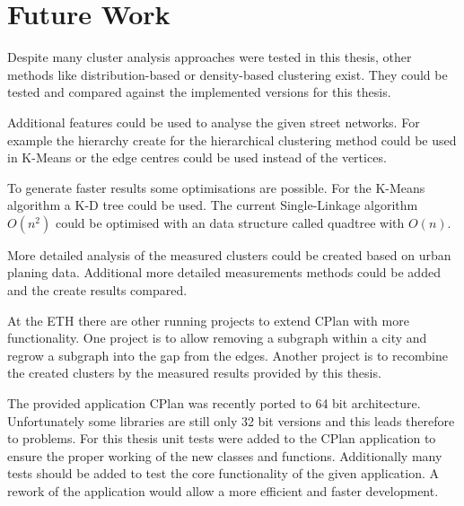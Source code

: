 \chapter{Future Work}
\label{sec:future_work}

Despite many cluster analysis approaches were tested in this thesis, other methods like distribution-based or density-based clustering exist. They could be tested and compared against the implemented versions for this thesis.

Additional features could be used to analyse the given street networks. For example the hierarchy create for the hierarchical clustering method could be used in K-Means or the edge centres could be used instead of the vertices.

To generate faster results some optimisations are possible. For the K-Means algorithm a K-D tree could be used. The current Single-Linkage algorithm $O(n^2)$ could be optimised with an data structure called quadtree with $O(n)$.

More detailed analysis of the measured clusters could be created based on urban planing data. Additional more detailed measurements methods could be added and the create results compared.

At the ETH there are other running projects to extend CPlan with more functionality. One project is to allow removing a subgraph within a city and regrow a subgraph into the gap from the edges. Another project is to recombine the created clusters by the measured results provided by this thesis.

The provided application CPlan was recently ported to 64 bit architecture. Unfortunately some libraries are still only 32 bit versions and this leads therefore to problems. For this thesis unit tests were added to the CPlan application to ensure the proper working of the new classes and functions. Additionally many tests should be added to test the core functionality of the given application. A rework of the application would allow a more efficient and faster development.